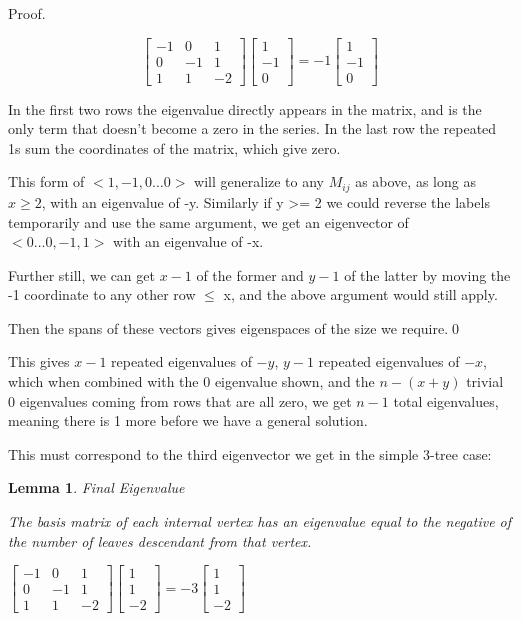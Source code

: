 \documentclass[10pt,a4paper]{report}
\newtheorem{lemma}{Lemma}
\begin{document}
Proof.

\begin{equation*}
\left[\begin{matrix}
	-1 & 0 & 1\\
	0 & -1 & 1\\
	1 & 1 & -2
\end{matrix}\right]
\left[\begin{matrix}
	1\\
	-1\\
	0
\end{matrix}\right]
=
-1
\left[\begin{matrix}
	1\\
	-1\\
	0
\end{matrix}\right]
\end{equation*}

In the first two rows the eigenvalue directly appears in the matrix, and is the
only term that doesn't become a zero in the series.
In the last row the repeated 1s sum the coordinates of the matrix, which give
zero.

This form of $<1, -1, 0\ldots 0>$ will generalize to any $M_{ij}$ as above, as
long as $x \geq 2$, with an eigenvalue of -y.
Similarly if y >= 2 we could reverse the labels temporarily and use the same
argument, we get an eigenvector of $<0\ldots 0, -1, 1>$ with an eigenvalue of
-x.

Further still, we can get $x-1$ of the former and $y-1$ of the latter by moving
the -1 coordinate to any other row $\leq$ x, and the above argument would still
apply.

Then the spans of these vectors gives eigenspaces of the size we require.\qed


This gives $x-1$ repeated eigenvalues of $-y$, $y-1$ repeated eigenvalues of
$-x$, which when combined with the 0 eigenvalue shown, and the $n - (x + y)$
trivial $0$ eigenvalues coming from rows that are all zero, we get $n-1$ total
eigenvalues, meaning there is 1 more before we have a general solution.

This must correspond to the third eigenvector we get in the simple 3-tree case:

\begin{lemma} Final Eigenvalue

	The basis matrix of each internal vertex has an eigenvalue equal to the
	negative of the number of leaves descendant from that vertex.
\end{lemma}

$
\left[\begin{matrix}
	-1 & 0 & 1\\
	0 & -1 & 1\\
	1 & 1 & -2
\end{matrix}\right]
\left[\begin{matrix}
	1\\
	1\\
	-2
\end{matrix}\right]
=
-3
\left[\begin{matrix}
	1\\
	1\\
	-2
\end{matrix}\right]
$
\end{document}
